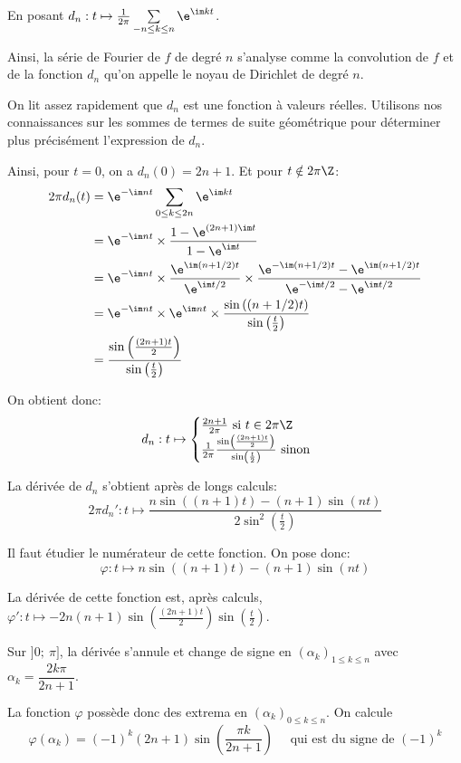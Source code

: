 En posant $d_n: t \mapsto \frac{1}{2\pi}\sum \limits_{-n \leq k \leq n} \e^{\im kt}$.

Ainsi, la série de Fourier de $f$ de degré $n$ s'analyse comme la convolution de $f$ et de la fonction $d_n$ qu'on appelle le noyau de Dirichlet de degré $n$.

On \og lit \fg{} assez rapidement que $d_n$ est une fonction à valeurs réelles. Utilisons nos connaissances sur les sommes de termes de suite géométrique pour déterminer plus précisément l'expression de $d_n$.

Ainsi, pour $t=0$, on a $d_n(0) = 2n+1$. Et pour $t \notin 2\pi \Z$:
\begin{align*}
2\pi d_n(t) & = \e^{-\im n t} \sum \limits_{0 \leq k \leq 2n} \e^{\im kt} \\
 & = \e^{-\im n t} \times \dfrac{1-\e^{(2n+1) \im t}}{1-\e^{\im t}} \\
 & = \e^{-\im n t} \times \dfrac{\e^{\im (n+1/2)t}}{\e^{\im t/2}} \times \dfrac{\e^{-\im (n+1/2)t} - \e^{\im (n+1/2)t}}{\e^{-\im t/2}- \e^{\im t/2}} \\
 & = \e^{-\im n t} \times \e^{\im n t} \times \dfrac{\sin\left ((n+1/2)t \right )}{\sin \left ( \frac{t}{2}\right )}  \\
 & = \dfrac{\sin \left ( \frac{(2n+1)t}{2}\right )}{\sin \left ( \frac{t}{2}\right )}
\end{align*}


On obtient donc:
\[
d_n: t \mapsto \begin{cases}
\frac{2n+1}{2\pi} \text{ si }t \in 2\pi\Z \\
\frac{1}{2\pi} \frac{\sin \left ( \frac{(2n+1)t}{2}\right )}{\sin \left ( \frac{t}{2}\right )} \text{ sinon }
\end{cases}
\]

La dérivée de $d_n$ s'obtient après de longs calculs:
\[
2 \pi d_n': t \mapsto \dfrac{n \sin\left ((n+1)t \right ) - (n+1) \sin(n t)}{2\sin^2 \left ( \frac{t}{2}\right )}
\]

Il faut étudier le numérateur de cette fonction. On pose donc:
\[
\varphi: t \mapsto n \sin\left ((n+1)t \right ) - (n+1) \sin(n t)
\]

La dérivée de cette fonction est, après calculs, $\varphi': t \mapsto -2n(n+1)\sin \left ( \frac{(2n+1)t}{2}\right ) \sin \left (\frac{t}{2} \right )$. 

Sur $]0;~\pi]$, la dérivée s'annule et change de signe en $(\alpha_k)_{1 \leq k \leq n}$ avec $\alpha_k = \dfrac{2k\pi}{2n+1}$.

La fonction $\varphi$ possède donc des extrema en $(\alpha_k)_{0 \leq k \leq n}$. On calcule
\[
\varphi(\alpha_k) = (-1)^k(2n+1)\sin\left ( \frac{\pi k}{2n+1}\right ) \quad \text{ qui est du signe de }(-1)^k
\]

